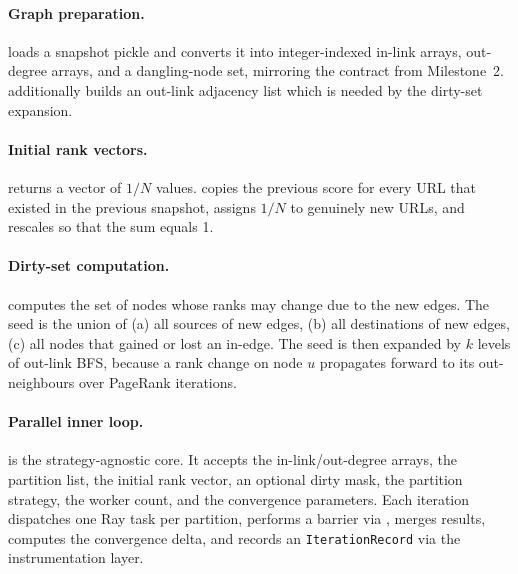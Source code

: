\documentclass[11pt,a4paper]{article}
\begin{document}
\paragraph{Graph preparation.} 
loads a snapshot pickle and converts it into integer-indexed in-link
arrays, out-degree arrays, and a dangling-node set, mirroring the
 contract from Milestone~2.
 additionally builds an out-link adjacency
list which is needed by the dirty-set expansion.

\paragraph{Initial rank vectors.}
 returns a vector of $1/N$ values.
copies the previous score for every URL that existed in the previous
snapshot, assigns $1/N$ to genuinely new URLs, and rescales so that the
sum equals 1.

\paragraph{Dirty-set computation.}
 computes the
set of nodes whose ranks may change due to the new edges. The seed is
the union of (a) all sources of new edges, (b) all destinations of new
edges, (c) all nodes that gained or lost an in-edge. The seed is then
expanded by $k$ levels of out-link BFS, because a rank change on node
$u$ propagates forward to its out-neighbours over PageRank iterations.

\paragraph{Parallel inner loop.}  is
the strategy-agnostic core. It accepts the in-link/out-degree arrays,
the partition list, the initial rank vector, an optional dirty mask,
the partition strategy, the worker count, and the convergence
parameters. Each iteration dispatches one Ray task per partition,
performs a barrier via , merges results, computes
the convergence delta, and records an \texttt{IterationRecord} via the
instrumentation layer.
\end{document}
